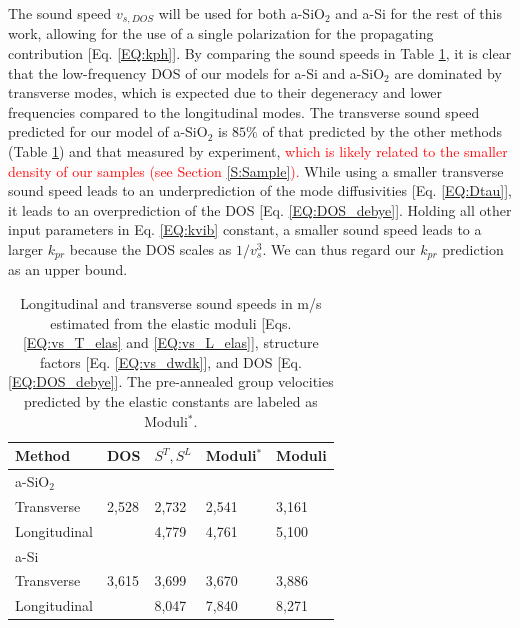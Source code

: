 \documentclass[aps,prb,twocolumn,superscriptaddress,footinbib,amsmath,amssymb,floatfix]{revtex4}
\begin{document}
The sound speed $v_{s,DOS}$ will be used for both 
a-SiO$_2$ and a-Si for the rest of this work, allowing 
for the use of a single polarization for the propagating 
contribution [Eq. \eqref{EQ:kph}]. 
By comparing the sound speeds in Table \ref{T:vs}, it is clear that 
the low-frequency DOS of our models for a-Si and a-SiO$_2$ are 
dominated by 
transverse modes, which is expected due to their degeneracy and lower 
frequencies compared to the longitudinal modes.  
The transverse sound speed predicted for our model of 
a-SiO$_2$ is $85\%$ of that predicted by 
the other methods (Table \ref{T:vs}) and that measured by experiment,
\cite{ruocco_high-frequency_2001,polian_elastic_2002,
ruzicka_evidence_2004} 
\textcolor{red}{which is likely related to the smaller density 
of our samples (see Section \ref{S:Sample}).} 
While using a smaller transverse sound speed 
leads to an underprediction of the
mode diffusivities [Eq. \eqref{EQ:Dtau}], it leads to an
overprediction of the DOS [Eq. \eqref{EQ:DOS_debye}]. 
Holding all other input parameters in Eq. \eqref{EQ:kvib} constant,
a smaller sound speed leads to a larger $k_{pr}$ 
because the DOS scales as $1/v^3_{s}$. We can thus regard
our $k­_{pr}$ prediction as an upper bound.

\begin{center}
\begingroup
\begin{table}
\caption{\label{T:vs}
Longitudinal and transverse sound speeds in m/s estimated from the 
elastic moduli [Eqs. \eqref{EQ:vs_T_elas} and \eqref{EQ:vs_L_elas}], 
structure factors [Eq. \eqref{EQ:vs_dwdk}], and 
DOS [Eq. \eqref{EQ:DOS_debye}]. The pre-annealed group velocities 
predicted by the elastic constants are labeled as Moduli$^*$.}
\begin{tabular}{lllll}
\hline \hline
Method & DOS & $S^{T}, S^{L}$ & Moduli$^*$ & Moduli \\
\hline
a-SiO$_2$ \\
\hline
Transverse & 2,528 & 2,732 & 2,541 & 3,161 \\
Longitudinal &  & 4,779 & 4,761 & 5,100 \\
\hline
a-Si \\
\hline
Transverse & 3,615 & 3,699 & 3,670 & 3,886 \\
Longitudinal &  & 8,047 & 7,840 & 8,271 \\
\hline \hline
\end{tabular}
\end{table}
\endgroup
\end{center}
\end{document}
